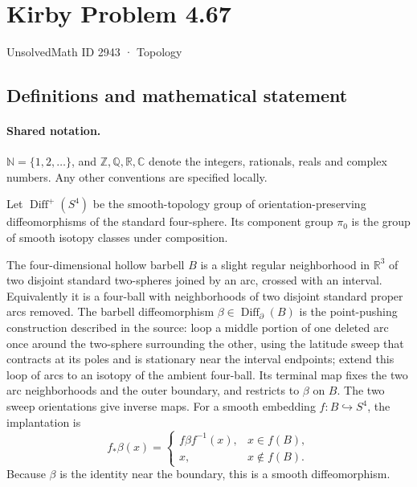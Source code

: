 \documentclass[11pt]{article}
\begin{document}
\setcounter{section}{2942}
\section{Kirby Problem 4.67}\label{2943}
{\small\sffamily UnsolvedMath ID 2943 · Topology}
\subsection{Definitions and mathematical statement}

\paragraph{Shared notation.}$\mathbb N=\{1,2,\ldots\}$, and $\mathbb Z,\mathbb Q,\mathbb R,\mathbb C$ denote the integers, rationals, reals and complex numbers. Any other conventions are specified locally.


Let $\operatorname{Diff}^+(S^4)$ be the smooth-topology group of orientation-preserving diffeomorphisms of the standard four-sphere. Its component group $\pi_0$ is the group of smooth isotopy classes under composition.

The four-dimensional hollow barbell $B$ is a slight regular neighborhood in $\mathbb R^3$ of two disjoint standard two-spheres joined by an arc, crossed with an interval. Equivalently it is a four-ball with neighborhoods of two disjoint standard proper arcs removed. The barbell diffeomorphism $\beta\in\operatorname{Diff}_{\partial}(B)$ is the point-pushing construction described in the source: loop a middle portion of one deleted arc once around the two-sphere surrounding the other, using the latitude sweep that contracts at its poles and is stationary near the interval endpoints; extend this loop of arcs to an isotopy of the ambient four-ball. Its terminal map fixes the two arc neighborhoods and the outer boundary, and restricts to $\beta$ on $B$. The two sweep orientations give inverse maps. For a smooth embedding $f:B\hookrightarrow S^4$, the implantation is
\[
f_*\beta(x)=
\begin{cases}
f\beta f^{-1}(x),&x\in f(B),\\
x,&x\notin f(B).
\end{cases}
\]
Because $\beta$ is the identity near the boundary, this is a smooth diffeomorphism.
\end{document}
